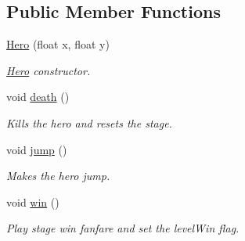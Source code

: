 \subsection*{Public Member Functions}
\begin{DoxyCompactItemize}
\item 
\hyperlink{class_hero_a8deb36af7263b83c52e62a98f31ea5cb}{Hero} (float x, float y)
\begin{DoxyCompactList}\small\item\em \hyperlink{class_hero}{Hero} constructor. \end{DoxyCompactList}\item 
void \hyperlink{class_hero_a62d93b951b0b769c75ddbdf1615660a0}{death} ()\hypertarget{class_hero_a62d93b951b0b769c75ddbdf1615660a0}{}\label{class_hero_a62d93b951b0b769c75ddbdf1615660a0}

\begin{DoxyCompactList}\small\item\em Kills the hero and resets the stage. \end{DoxyCompactList}\item 
void \hyperlink{class_hero_a1bee38d9164cf1ecda512cc24e81b171}{jump} ()\hypertarget{class_hero_a1bee38d9164cf1ecda512cc24e81b171}{}\label{class_hero_a1bee38d9164cf1ecda512cc24e81b171}

\begin{DoxyCompactList}\small\item\em Makes the hero jump. \end{DoxyCompactList}\item 
void \hyperlink{class_hero_a871ff7549c75b1099ff9b13bf6c41cf3}{win} ()\hypertarget{class_hero_a871ff7549c75b1099ff9b13bf6c41cf3}{}\label{class_hero_a871ff7549c75b1099ff9b13bf6c41cf3}

\begin{DoxyCompactList}\small\item\em Play stage win fanfare and set the level\+Win flag. \end{DoxyCompactList}\end{DoxyCompactItemize}
